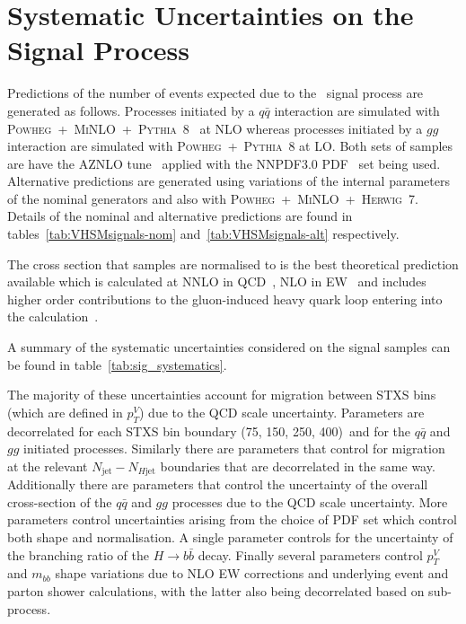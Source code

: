 \section{Systematic Uncertainties on the Signal Process}

Predictions of the number of events expected due to the \VHbb\ signal process
are generated as follows. Processes initiated by a $q\bar{q}$ interaction are
simulated with
\textsc{Powheg}~+~\textsc{MiNLO}~+~\textsc{Pythia}~8~\cite{Luisoni2013,
  Sjostrand2008852} at NLO whereas processes initiated by a $gg$ interaction are
simulated with \textsc{Powheg}~+~\textsc{Pythia}~8 at LO. Both sets of samples
are have the AZNLO tune~\cite{Aad:2014xaa} applied with the NNPDF3.0
PDF~\cite{Ball:2014uwa} set being used. Alternative predictions are generated 
using variations of the internal parameters of the nominal generators and also
with \textsc{Powheg}~+~\textsc{MiNLO}~+~\textsc{Herwig}~7. Details of the
nominal and alternative predictions are found in
tables~\ref{tab:VHSMsignals-nom} and~\ref{tab:VHSMsignals-alt} respectively.

The cross section that samples are normalised to is the best theoretical
prediction available which is calculated at NNLO in QCD~\cite{Brein:2003wg,
  Brein:2011vx}, NLO in EW~\cite{Denner:2012sx} and includes higher order
contributions to the gluon-induced heavy quark loop entering into the \ZH
calculation~\cite{Altenkamp:2012sx}.

A summary of the systematic uncertainties considered on the signal samples can
be found in table~\ref{tab:sig_systematics}.

The majority of these uncertainties account for migration between STXS bins
(which are defined in $p_T^V$) due to the QCD scale uncertainty. Parameters are
decorrelated for each STXS bin boundary (75, 150, 250, 400)~\GeV and for the
$q\bar{q}$ and $gg$ initiated processes. Similarly there are parameters that
control for migration at the relevant $N_{\text{jet}} - N_{H\text{jet}}$
boundaries that are decorrelated in the same way. Additionally there are
parameters that control the uncertainty of the overall cross-section of the
$q\bar{q}$ and $gg$ processes due to the QCD scale uncertainty. More parameters
control uncertainties arising from the choice of PDF set which control both
shape and normalisation. A single parameter controls for the uncertainty of the
branching ratio of the $H \to b{\bar{b}}$ decay. Finally several parameters
control  $p_T^V$ and $m_{bb}$ shape variations due to NLO EW corrections and
underlying event and parton shower calculations, with the latter also being
decorrelated based on sub-process. 